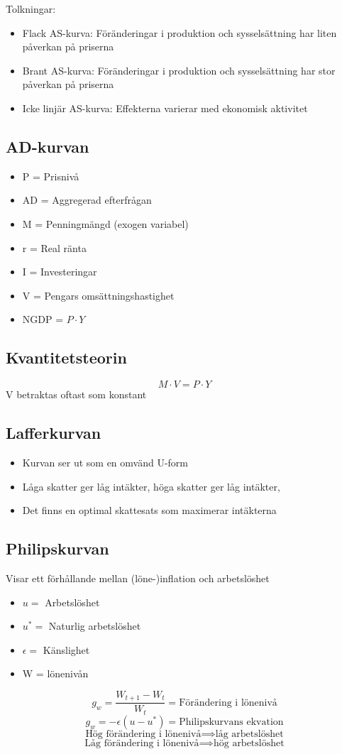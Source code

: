 \documentclass[12pt,a4paper]{article}
\begin{document}
\noindent Tolkningar:
\begin{itemize}
    \item Flack AS-kurva: Föränderingar i produktion och sysselsättning har liten påverkan på priserna
    \item Brant AS-kurva: Föränderingar i produktion och sysselsättning har stor påverkan på priserna
    \item Icke linjär AS-kurva: Effekterna varierar med ekonomisk aktivitet
\end{itemize}

\subsection*{AD-kurvan}
\begin{itemize}
    \item P = Prisnivå
    \item AD = Aggregerad efterfrågan
    \item M = Penningmängd (exogen variabel)
    \item r = Real ränta
    \item I = Investeringar
    \item V = Pengars omsättningshastighet
    \item NGDP = $P \cdot Y$
\end{itemize}

\subsection*{Kvantitetsteorin}
$$M \cdot V = P \cdot Y$$
V betraktas oftast som konstant

\subsection*{Lafferkurvan}
\begin{itemize}
    \item Kurvan ser ut som en omvänd U-form
    \item Låga skatter ger låg intäkter, höga skatter ger låg intäkter, 
    \item Det finns en optimal skattesats som maximerar intäkterna
\end{itemize}

\subsection*{Philipskurvan}
Visar ett förhållande mellan (löne-)inflation och arbetslöshet
\begin{itemize}
    \item $u =$ Arbetslöshet
    \item $u^* =$ Naturlig arbetslöshet
    \item $\epsilon =$ Känslighet
    \item W = lönenivån
\end{itemize}
$$g_w = \frac{W_{t+1} - W_t}{W_t} = \text{Förändering i lönenivå}$$
$$g_w = -\epsilon (u - u^*) = \text{Philipskurvans ekvation}$$
$$\text{Hög förändering i lönenivå} \implies \text{låg arbetslöshet}$$
$$\text{Låg förändering i lönenivå} \implies \text{hög arbetslöshet}$$
\end{document}
